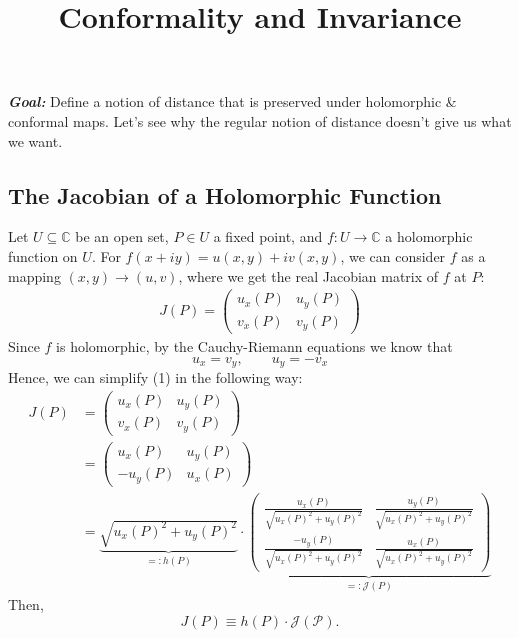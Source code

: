 \documentclass[10pt]{article}
\title{\textbf{Conformality and Invariance}}
\date{}
\theoremstyle{plain}
\begin{document}
	\maketitle 
	
\noindent \textbf{\textit{Goal:}} Define a notion of distance that is preserved under holomorphic \& conformal maps. Let's see why the regular notion of distance doesn't give us what we want.



\subsection*{The Jacobian of a Holomorphic Function}


Let $U \subseteq \mathbb{C}$ be an open set, $P \in U$ a fixed point, and $f: U \to \mathbb{C}$ a holomorphic function on $U$. For $f(x + iy) = u(x, y) + iv(x,y)$, we can consider $f$ as a mapping $(x, y) \to (u, v)$, where we get the real Jacobian matrix of $f$ at $P$: 
	\begin{eqnarray}
		J(P) = \begin{pmatrix}u_x(P) & u_y(P) \\ v_x(P) & v_y(P)\end{pmatrix}
	\end{eqnarray}
Since $f$ is holomorphic, by the Cauchy-Riemann equations we know that
	\begin{equation}
		\boxed{u_x = v_y, \qquad u_y = -v_x}
	\end{equation}
Hence, we can simplify (1) in the following way:
	\begin{align*}
		J(P) &=  \begin{pmatrix}u_x(P) & u_y(P) \\ v_x(P) & v_y(P)\end{pmatrix} \\
		&= \begin{pmatrix}u_x(P) & u_y(P) \\ -u_y(P) & u_x(P)\end{pmatrix} \\
		&= \underbrace{\sqrt{u_x(P)^2 + u_y(P)^2}}_{=: h(P)} \cdot \underbrace{ \begin{pmatrix} \frac{u_x(P)}{\sqrt{u_x(P)^2 + u_y(P)^2}} & \frac{u_y(P)}{\sqrt{u_x(P)^2 + u_y(P)^2}} \\ \frac{-u_y(P)}{\sqrt{u_x(P)^2 + u_y(P)^2}} & \frac{u_x(P)}{\sqrt{u_x(P)^2 + u_y(P)^2}} \end{pmatrix}} _{=: \mathcal{J}(P)}
	\end{align*}
Then, 
	\begin{equation}
		J(P) \equiv h(P) \cdot \mathcal{J(P)}.
	\end{equation}
\end{document}
